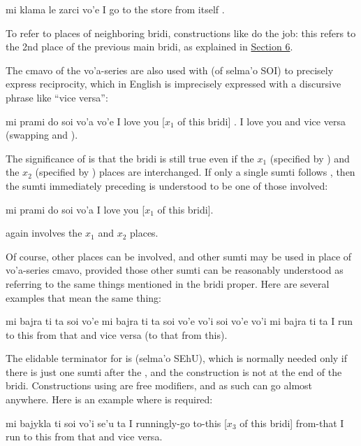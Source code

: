 \begin{example}
mi klama le zarci vo'e\n
I go to the store from itself\n
\T	{}.
\end{example}

To refer to places of neighboring bridi, constructions like
     do the job: this refers to the 2nd place of
    the previous main bridi, as explained in \hyperref[sec:7:6]{Section
    6}. 

The cmavo of the vo'a-series are also used with  (of
    selma'o SOI) to precisely express reciprocity, which in English
    is imprecisely expressed with a discursive phrase like ``vice
    versa'':
\begin{example}
mi prami do\n
\T	soi vo'a vo'e\n
I love you\n
\T	{} [$x_1$ of this bridi]\n
{}.\n
I love you and vice versa (swapping  and ).
\end{example}

The significance of  is that the bridi is
    still true even if the $x_1$ (specified by ) and the $x_2$
    (specified by ) places are interchanged. If only a
    single sumti follows , then the sumti immediately
    preceding  is understood to be one of those involved:
\begin{example}
mi prami do soi vo'a\n
I love you  [$x_1$ of this bridi].
\end{example}

{\noindent}again involves the $x_1$ and $x_2$ places. 

Of course, other places can be involved, and other sumti may
    be used in place of vo'a-series cmavo, provided those other
    sumti can be reasonably understood as referring to the same
    things mentioned in the bridi proper. Here are several examples
    that mean the same thing:
\begin{example}
mi bajra ti ta soi vo'e\n
mi bajra ti ta soi vo'e vo'i\n
soi vo'e vo'i mi bajra ti ta\n
I run to this from that and vice versa\n
\T	(to that from this).
\end{example}

The elidable terminator for  is  (selma'o SEhU),
    which is normally needed only if there is just one sumti after
    the , and the  construction is not at the end of
    the bridi. Constructions using  are free modifiers, and
    as such can go almost anywhere. Here is an example where
     is required:
\begin{example}
mi bajykla ti\n
\T	soi vo'i se'u ta\n
I runningly-go to-this\n
\T	{} [$x_3$ of this bridi] from-that\n
I run to this from that and vice versa.
\end{example}

